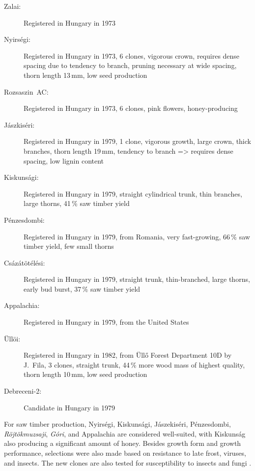 \begin{description}
  \item[Zalai:] Registered in Hungary in 1973 \citep{keresztesi1983robinie}
  \item[Nyirségi:] Registered in Hungary in 1973, 6 clones, vigorous crown, requires dense spacing due to tendency to branch, pruning necessary at wide spacing, thorn length 13\,mm, low seed production \citep{keresztesi1983robinie,kapusi1995robinie,abri2024dis}
  \item[Rozsaszin~AC:] Registered in Hungary in 1973, 6 clones, pink flowers, honey-producing \citep{keresztesi1983robinie,kapusi1995robinie}
  \item[Jászkiséri:] Registered in Hungary in 1979, 1 clone, vigorous growth, large crown, thick branches, thorn length 19\,mm, tendency to branch => requires dense spacing, low lignin content \citep{keresztesi1983robinie,zsombor1980robinie,kapusi1995robinie,abri2024dis}
  \item[Kiskunsági:] Registered in Hungary in 1979, straight cylindrical trunk, thin branches, large thorns, 41\,\% saw timber yield \citep{keresztesi1983robinie,zsombor1980robinie}
  \item[Pénzesdombi:] Registered in Hungary in 1979, from Romania, very fast-growing, 66\,\% saw timber yield, few small thorns \citep{zsombor1980robinie}
  \item[Csázátötélési:] Registered in Hungary in 1979, straight trunk, thin-branched, large thorns, early bud burst, 37\,\% saw timber yield \citep{zsombor1980robinie}
  \item[Appalachia:] Registered in Hungary in 1979, from the United States
  \item[Üllöi:] Registered in Hungary in 1982, from Üllő Forest Department 10D by J.~Fila, 3 clones, straight trunk, 44\,\% more wood mass of highest quality, thorn length 10\,mm, low seed production \citep{bach1983robinie,kapusi1995robinie,abri2024dis,redei2020ulloi}
  \item[Debreceni-2:] Candidate in Hungary in 1979 \citep{keresztesi1983robinie}
\end{description}

For saw timber production, Nyirségi, Kiskunsági, Jászekiséri, Pénzesdombi, \emph{Röjtökmuzsaji}, \emph{Góri}, and Appalachia are considered well-suited, with Kiskunság also producing a significant amount of honey. Besides growth form and growth performance, selections were also made based on resistance to late frost, viruses, and insects. The new clones are also tested for susceptibility to insects and fungi \citep{abri2024robinieResistenz}.

